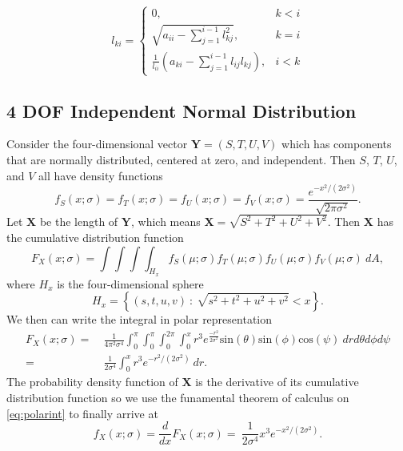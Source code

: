 \documentclass[conference]{IEEEtran}
\begin{document}
\[ 
   l_{ki} = 
	 \begin{cases} 
      0, & k < i \\
      \sqrt{a_{ii} - \sum_{j=1}^{i-1}l^2_{kj}}, & k=i \\
      \frac{1}{l_{ii}} (a_{ki} - \sum_{j=1}^{i-1}l_{ij}l_{kj}), & i < k 
   \end{cases}
\]

\subsection{4 DOF Independent Normal Distribution}
Consider the four-dimensional vector $\textbf{Y} = (S,T,U,V)$ which has components that are normally distributed, centered at zero, and independent. 
Then $S$, $T$, $U$, and $V$ all have density functions
\begin{equation}
f_S(x;\sigma) = f_T(x;\sigma) = f_U(x;\sigma) = f_V(x;\sigma) = \frac{e^{-x^2/(2\sigma^2)}}{\sqrt{2\pi\sigma^2}}.
\label{eq:single_dists}
\end{equation}
Let $\textbf{X}$ be the length of $\textbf{Y}$, which means $\textbf{X} = \sqrt{S^2+T^2+U^2+V^2}$.
Then $\textbf{X}$ has the cumulative distribution function
\begin{equation}
F_X(x;\sigma) = \int \!\!\!\int \!\!\!\int \!\!\!\int_{H_x} \!\!f_S(\mu;\sigma)f_T(\mu;\sigma)f_U(\mu;\sigma)f_V(\mu;\sigma) ~dA,
\label{eq:cumdist}
\end{equation}
where $H_x$ is the four-dimensional sphere
\begin{equation}
H_x = \left\{(s,t,u,v)~:~\sqrt{s^2+t^2+u^2+v^2} < x \right\}.
\label{eq:4dsphere}
\end{equation}
We then can write the integral in polar representation
\begin{align}
F_X(x;\sigma) = & ~\frac{1}{4\pi^2\sigma^4} \!\int_0^\pi \!\!\!\!\int_0^\pi \!\!\!\!\int_0^{2\pi} \!\!\!\!\!\int_0^x \!r^3e^{\frac{-r^2}{2\sigma^2}} \mbox{sin}(\theta) \mbox{sin}(\phi) \mbox{cos}(\psi) ~dr d\theta d\phi d\psi \nonumber \\
= & ~\frac{1}{2\sigma^4} \int_0^x r^3e^{-r^2/(2\sigma^2)} ~dr.
\label{eq:polarint}
\end{align}
The probability density function of $\textbf{X}$ is the derivative of its cumulative distribution function so we use the funamental theorem of calculus on \eqref{eq:polarint} to finally arrive at
\begin{equation}
f_X(x;\sigma) = \frac{d}{dx}F_X(x;\sigma) =  ~\frac{1}{2\sigma^4} x^3e^{-x^2/(2\sigma^2)}.
\label{eq:finaldist}
\end{equation}
\end{document}
